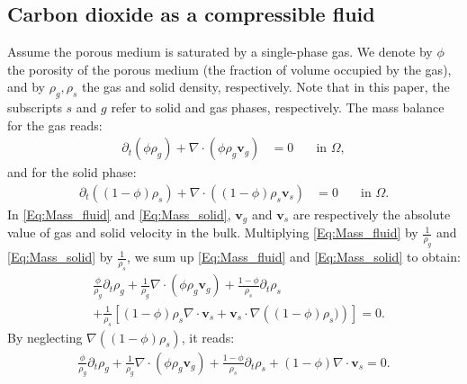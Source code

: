 \subsection{Carbon dioxide as a compressible fluid} \label{Sec:CO2}
Assume the porous medium is saturated by a single-phase gas. We denote by $\phi$ the porosity of the porous medium (the fraction of volume occupied by the gas), and by $\rho_g, \rho_s$ the gas and solid density, respectively. Note that in this paper, the subscripts $s$  and $g$ refer to solid and gas phases, respectively. The mass balance for the gas reads:
\begin{equation}\label{Eq:Mass_fluid}
    \begin{aligned}
        \partial_t\left(\phi\rho_g\right)  +\nabla\cdot\left(\phi\rho_g \mathbf{v}_g\right)&=0  \quad  &\text{in~} \Omega,
    \end{aligned}
\end{equation}
and for the solid phase:
\begin{equation}\label{Eq:Mass_solid}
\begin{aligned}
\partial_t\left(\left(1- \phi\right) \rho_s\right) + \nabla\cdot\left(\left(1- \phi\right)\rho_s \mathbf{v}_s\right)&=0  \quad  &\text{in~} \Omega.
\end{aligned}
\end{equation}
In \eqref{Eq:Mass_fluid} and \eqref{Eq:Mass_solid}, $\mathbf{v}_g$ and $\mathbf{v}_s$ are respectively the absolute value of gas and solid velocity in the bulk.
Multiplying \eqref{Eq:Mass_fluid} by $\frac{1}{\rho_g}$ and \eqref{Eq:Mass_solid} by $\frac{1}{\rho_s}$, we sum up \eqref{Eq:Mass_fluid} and \eqref{Eq:Mass_solid} to obtain:
\begin{equation*}\label{Eq:Mass_sum}
	\begin{aligned}
	&\frac{\phi}{\rho_g}\partial_t\rho_g+\frac{1}{\rho_g}\nabla\cdot\left(\phi\rho_g \mathbf{v}_g\right)+\frac{1-\phi}{\rho_s}\partial_t\rho_s\\
	&+\frac{1}{\rho_s}\left[(1-\phi)\rho_s \nabla \cdot \mathbf{v}_s+\mathbf{v}_s \cdot \nabla \left((1-\phi)\rho_s)\right)\right]=0.
	\end{aligned}
\end{equation*}
By neglecting $\nabla\left(\left(1-\phi\right)\rho_s\right)$, it reads:%
\begin{equation}\label{Eq:Mass_sum_intmediate}
	\begin{aligned}
        \frac{\phi}{\rho_g }\partial_t\rho_g+\frac{1}{\rho_g}\nabla\cdot\left(\phi\rho_g \mathbf{v}_g\right)+\frac{1-\phi}{\rho_s}\partial_t\rho_s+(1-\phi)\nabla\cdot \mathbf{v}_s=0.
	\end{aligned}
\end{equation}
